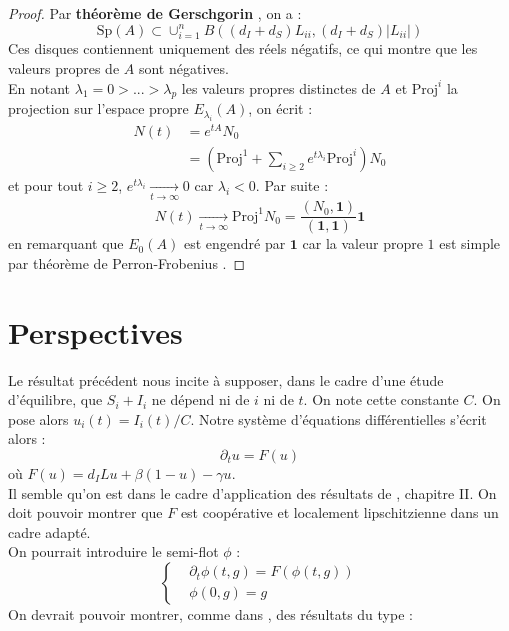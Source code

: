 \documentclass[a4paper,10.9pt]{article}
\begin{document}
\begin{proof}
Par \textbf{théorème de Gerschgorin} \cite{Gerschgorin}, on a :
$$\text{Sp}(A) \subset \cup_{i=1}^n B((d_I+d_S)L_{ii}, (d_I+d_S)|L_{ii}|)$$
Ces disques contiennent uniquement des réels négatifs, ce qui montre que les valeurs propres de $A$ sont négatives. \\

En notant $\lambda_1=0 > ... > \lambda_p$ les valeurs propres distinctes de $A$ et $\text{Proj}^{i}$ la projection sur l'espace propre $E_{\lambda_i}(A)$, on écrit :
\begin{align*}
N(t) & = e^{tA} N_0 \\
& = \left( \text{Proj}^{1} + \sum_{i \geq 2} e^{t \lambda_i} \text{Proj}^i \right)N_0
\end{align*}
et pour tout $i \geq 2$, $e^{t \lambda_i} \underset{t \to \infty}{\longrightarrow} 0$ car $\lambda_i < 0$.
Par suite :
$$\boxed{N(t) \underset{t \to \infty}{\longrightarrow} \text{Proj}^1 N_0 = \frac{(N_0, \textbf{1})}{(\textbf{1}, \textbf{1})} \textbf{1}}$$
en remarquant que $E_0(A)$ est engendré par $\textbf{1}$ car la valeur propre $1$ est simple par théorème de Perron-Frobenius \cite{Perron}.
\end{proof}

\section{Perspectives} 

Le résultat précédent nous incite à supposer, dans le cadre d'une étude d'équilibre, que $S_i+I_i$ ne dépend ni de $i$ ni de $t$. On note cette constante $C$. On pose alors $u_i(t)=I_i(t)/C$. Notre système d'équations différentielles s'écrit alors :
$$\partial_t u = F(u)$$
où $F(u) = d_I Lu + \beta (1-u) - \gamma u$. \\

Il semble qu'on est dans le cadre d'application des résultats de \cite{DronnierThesis}, chapitre II. On doit pouvoir montrer que $F$ est coopérative et localement lipschitzienne dans un cadre adapté. \\ 
On pourrait introduire le semi-flot $\phi$ : 
$$\left\{
\begin{aligned}
& \partial_t \phi(t,g) = F(\phi(t,g)) \\
& \phi(0,g)=g
\end{aligned}
\right.$$ 
On devrait pouvoir montrer, comme dans \cite{DronnierThesis}, des résultats du type :  \\
\end{document}
